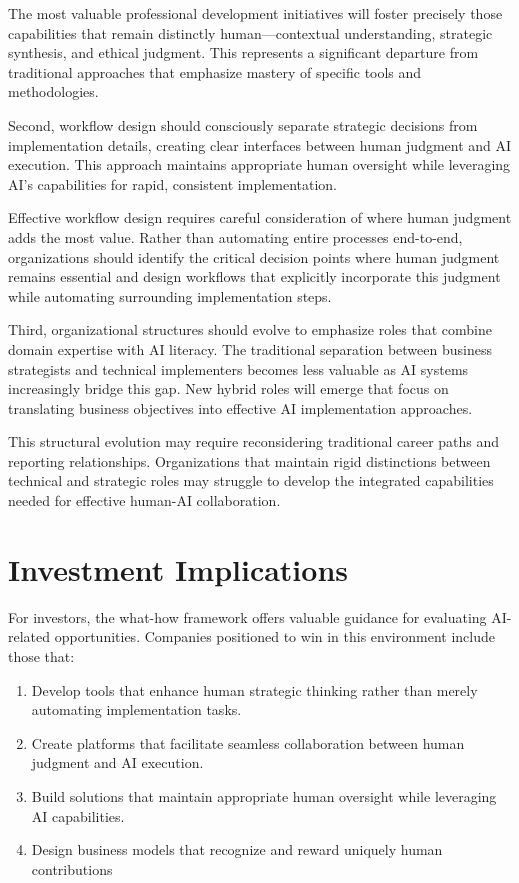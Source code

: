 \documentclass[
  Letterpaper,
]{scrbook}
\providecommand{\tightlist}{%
  \setlength{\itemsep}{0pt}\setlength{\parskip}{0pt}}\usepackage{longtable,booktabs,array}
\begin{document}
The most valuable professional development initiatives will foster
precisely those capabilities that remain distinctly human---contextual
understanding, strategic synthesis, and ethical judgment. This
represents a significant departure from traditional approaches that
emphasize mastery of specific tools and methodologies.

Second, workflow design should consciously separate strategic decisions
from implementation details, creating clear interfaces between human
judgment and AI execution. This approach maintains appropriate human
oversight while leveraging AI's capabilities for rapid, consistent
implementation.

Effective workflow design requires careful consideration of where human
judgment adds the most value. Rather than automating entire processes
end-to-end, organizations should identify the critical decision points
where human judgment remains essential and design workflows that
explicitly incorporate this judgment while automating surrounding
implementation steps.

Third, organizational structures should evolve to emphasize roles that
combine domain expertise with AI literacy. The traditional separation
between business strategists and technical implementers becomes less
valuable as AI systems increasingly bridge this gap. New hybrid roles
will emerge that focus on translating business objectives into effective
AI implementation approaches.

This structural evolution may require reconsidering traditional career
paths and reporting relationships. Organizations that maintain rigid
distinctions between technical and strategic roles may struggle to
develop the integrated capabilities needed for effective human-AI
collaboration.

\section{Investment Implications}\label{investment-implications-1}

For investors, the what-how framework offers valuable guidance for
evaluating AI-related opportunities. Companies positioned to win in this
environment include those that:

\begin{enumerate}
\def\labelenumi{\arabic{enumi}.}
\tightlist
\item
  Develop tools that enhance human strategic thinking rather than merely
  automating implementation tasks.
\item
  Create platforms that facilitate seamless collaboration between human
  judgment and AI execution.
\item
  Build solutions that maintain appropriate human oversight while
  leveraging AI capabilities.
\item
  Design business models that recognize and reward uniquely human
  contributions
\end{enumerate}
\end{document}
